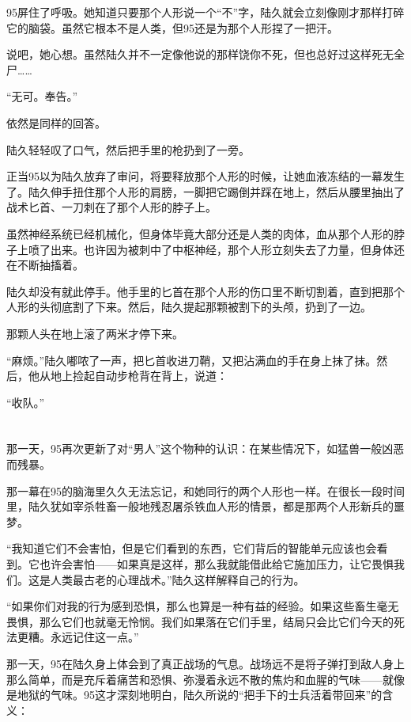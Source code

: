 95屏住了呼吸。她知道只要那个人形说一个“不”字，陆久就会立刻像刚才那样打碎它的脑袋。虽然它根本不是人类，但95还是为那个人形捏了一把汗。

说吧，她心想。虽然陆久并不一定像他说的那样饶你不死，但也总好过这样死无全尸……

“无可。奉告。”

依然是同样的回答。

陆久轻轻叹了口气，然后把手里的枪扔到了一旁。

正当95以为陆久放弃了审问，将要释放那个人形的时候，让她血液冻结的一幕发生了。陆久伸手扭住那个人形的肩膀，一脚把它踢倒并踩在地上，然后从腰里抽出了战术匕首、一刀刺在了那个人形的脖子上。

虽然神经系统已经机械化，但身体毕竟大部分还是人类的肉体，血从那个人形的脖子上喷了出来。也许因为被刺中了中枢神经，那个人形立刻失去了力量，但身体还在不断抽搐着。

陆久却没有就此停手。他手里的匕首在那个人形的伤口里不断切割着，直到把那个人形的头彻底割了下来。然后，陆久提起那颗被割下的头颅，扔到了一边。

那颗人头在地上滚了两米才停下来。

“麻烦。”陆久嘟哝了一声，把匕首收进刀鞘，又把沾满血的手在身上抹了抹。然后，他从地上捡起自动步枪背在背上，说道：

“收队。”

\section*{}

那一天，95再次更新了对“男人”这个物种的认识：在某些情况下，如猛兽一般凶恶而残暴。

那一幕在95的脑海里久久无法忘记，和她同行的两个人形也一样。在很长一段时间里，陆久犹如宰杀牲畜一般地残忍屠杀铁血人形的情景，都是那两个人形新兵的噩梦。

“我知道它们不会害怕，但是它们看到的东西，它们背后的智能单元应该也会看到。它也许会害怕——如果真是这样，那么我就能借此给它施加压力，让它畏惧我们。这是人类最古老的心理战术。”陆久这样解释自己的行为。

“如果你们对我的行为感到恐惧，那么也算是一种有益的经验。如果这些畜生毫无畏惧，那么它们也就毫无怜悯。我们如果落在它们手里，结局只会比它们今天的死法更糟。永远记住这一点。”

那一天，95在陆久身上体会到了真正战场的气息。战场远不是将子弹打到敌人身上那么简单，而是充斥着痛苦和恐惧、弥漫着永远不散的焦灼和血腥的气味——就像是地狱的气味。95这才深刻地明白，陆久所说的“把手下的士兵活着带回来”的含义：

